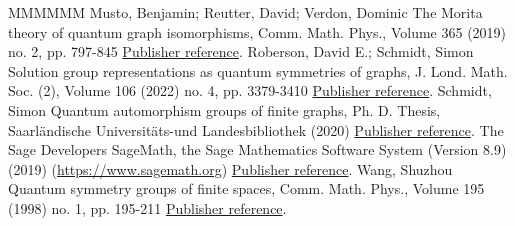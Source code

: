 \begin{thebibliography}{MMMMMM}
 Musto, Benjamin; Reutter, David; Verdon, Dominic The Morita theory of quantum graph isomorphisms, Comm. Math. Phys., Volume 365 (2019) no. 2, pp. 797-845 \href{https://alco.centre-mersenne.org/articles/10.5802/alco.335/#MRV}{Publisher reference}.
 Roberson, David E.; Schmidt, Simon Solution group representations as quantum symmetries of graphs, J. Lond. Math. Soc. (2), Volume 106 (2022) no. 4, pp. 3379-3410 \href{https://alco.centre-mersenne.org/articles/10.5802/alco.335/#RS}{Publisher reference}.
 Schmidt, Simon Quantum automorphism groups of finite graphs, Ph. D. Thesis, Saarländische Universitäts-und Landesbibliothek (2020) \href{https://alco.centre-mersenne.org/articles/10.5802/alco.335/#Sthesis}{Publisher reference}.
 The Sage Developers SageMath, the Sage Mathematics Software System (Version 8.9) (2019) (\url{https://www.sagemath.org}) \href{https://alco.centre-mersenne.org/articles/10.5802/alco.335/#sagemath}{Publisher reference}.
 Wang, Shuzhou Quantum symmetry groups of finite spaces, Comm. Math. Phys., Volume 195 (1998) no. 1, pp. 195-211 \href{https://alco.centre-mersenne.org/articles/10.5802/alco.335/#WanSn}{Publisher reference}.
\end{thebibliography}
